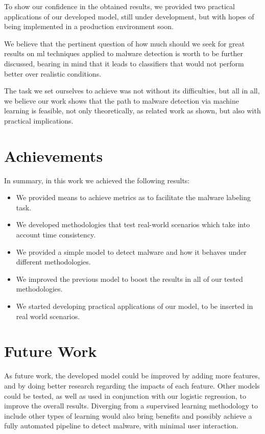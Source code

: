 To show our confidence in the obtained results, we provided two practical applications of our developed model, still under development, but with hopes of being implemented in a production environment soon.

We believe that the pertinent question of how much should we seek for great results on \gls{ml} techniques applied to malware detection is worth to be further discussed, bearing in mind that it leads to classifiers that would not perform better over realistic conditions.

The task we set ourselves to achieve was not without its difficulties, but all in all, we believe our work shows that the path to malware detection via machine learning is feasible, not only theoretically, as related work as shown, but also with practical implications.

\section{Achievements}
\label{section:achievements}

In summary, in this work we achieved the following results:

\begin{itemize}
	\item We provided means to achieve metrics as to facilitate the malware labeling task.
	\item We developed methodologies that test real-world scenarios which take into account time consistency.
	\item We provided a simple model to detect malware and how it behaves under different methodologies.
	\item We improved the previous model to boost the results in all of our tested methodologies.
	\item We started developing practical applications of our model, to be inserted in real world scenarios.
\end{itemize}

\section{Future Work}
\label{section:future}

As future work, the developed model could be improved by adding more features, and by doing better research regarding the impacts of each feature.
Other models could be tested, as well as used in conjunction with our logistic regression, to improve the overall results.
Diverging from a supervised learning methodology to include other types of learning would also bring benefits and possibly achieve a fully automated pipeline to detect malware, with minimal user interaction.
